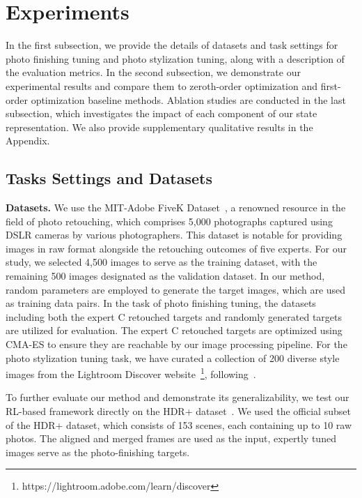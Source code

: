\documentclass{article}
\newcommand{\pipeline}{image processing pipeline\xspace}
\newcommand{\taskPFT}{photo finishing tuning\xspace}
\newcommand{\taskPST}{photo stylization tuning\xspace}
\begin{document}
\vspace{-8pt}
\section{Experiments}
\vspace{-6pt}
In the first subsection, we provide the details of datasets and task settings for \taskPFT and \taskPST, along with a description of the evaluation metrics. In the second subsection, we demonstrate our experimental results and compare them to zeroth-order optimization \cite{mosleh2020hardware} and first-order optimization \cite{tseng2019hyperparameter, tseng2022neural} baseline methods. 
Ablation studies are conducted in the last subsection, which investigates the impact of each component of our state representation.
We also provide supplementary qualitative results in the Appendix.

\vspace{-5pt}
\subsection{Tasks Settings and Datasets}
\label{sec:4.1}
\vspace{-3pt}


\noindent\textbf{Datasets.}  
We use the MIT-Adobe FiveK Dataset~\cite{fivek}, a renowned resource in the field of photo retouching, which comprises 5,000 photographs captured using DSLR cameras by various photographers. This dataset is notable for providing images in raw format alongside the retouching outcomes of five experts. For our study, we selected 4,500 images to serve as the training dataset, with the remaining 500 images designated as the validation dataset.
In our method, random parameters are employed to generate the target images, which are used as training data pairs. In the task of \taskPFT, the datasets including both the expert C retouched targets and randomly generated targets are utilized for evaluation. The expert C retouched targets are optimized using CMA-ES to ensure they are reachable by our \pipeline. For the \taskPST task, we have curated a collection of 200 diverse style images from the Lightroom Discover website~\footnote{https://lightroom.adobe.com/learn/discover}, following~\cite{shi2022spaceedit}.

To further evaluate our method and demonstrate its generalizability, we test our RL-based framework directly on the HDR+ dataset~\cite{hdrplus}. We used the official subset of the HDR+ dataset, which consists of 153 scenes, each containing up to 10 raw photos. The aligned and merged frames are used as the input, expertly tuned images serve as the photo-finishing targets.
\end{document}
